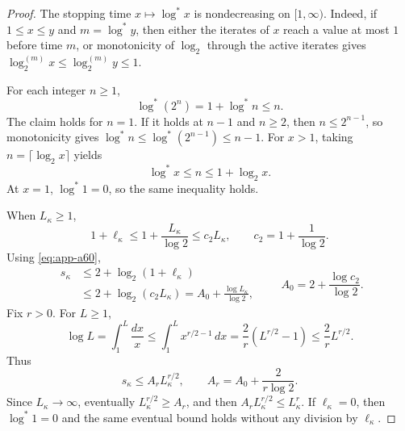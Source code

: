 \begin{proof}
The stopping time \(x\mapsto\log^*x\) is nondecreasing on
\([1,\infty)\).  Indeed, if \(1\leq x\leq y\) and
\(m=\log^*y\), then either the iterates of \(x\) reach a value at most
\(1\) before time \(m\), or monotonicity of \(\log_2\) through the
active iterates gives
\(\log_2^{(m)}x\leq\log_2^{(m)}y\leq1\).

For each integer \(n\geq1\),
\begin{equation}
\log^*(2^n)=1+\log^*n\leq n.
\label{eq:app-a59}
\end{equation}
The claim holds for \(n=1\).  If it holds at \(n-1\) and \(n\geq2\),
then \(n\leq2^{n-1}\), so monotonicity gives
\(\log^*n\leq\log^*(2^{n-1})\leq n-1\).  For \(x>1\), taking
\(n=\lceil\log_2x\rceil\) yields
\begin{equation}
\log^*x
\leq n
\leq1+\log_2x.
\label{eq:app-a60}
\end{equation}
At \(x=1\), \(\log^*1=0\), so the same inequality holds.

When \(L_\kappa\geq1\),
\begin{equation}
1+\ell_\kappa
\leq1+\frac{L_\kappa}{\log2}
\leq c_2L_\kappa,
\qquad
c_2=1+\frac1{\log2}.
\label{eq:app-a61}
\end{equation}
Using \eqref{eq:app-a60},
\begin{equation}
\begin{aligned}
s_\kappa
&\leq2+\log_2(1+\ell_\kappa)\\
&\leq2+\log_2(c_2L_\kappa)
=A_0+\frac{\log L_\kappa}{\log2},
\end{aligned}
\qquad
A_0=2+\frac{\log c_2}{\log2}.
\label{eq:app-a62}
\end{equation}
Fix \(r>0\).  For \(L\geq1\),
\begin{equation}
\log L
=\int_1^L\frac{dx}{x}
\leq\int_1^Lx^{r/2-1}\,dx
=\frac2r(L^{r/2}-1)
\leq\frac2rL^{r/2}.
\label{eq:app-a63}
\end{equation}
Thus
\begin{equation}
s_\kappa\leq
A_rL_\kappa^{r/2},
\qquad
A_r=A_0+\frac{2}{r\log2}.
\label{eq:app-a64}
\end{equation}
Since \(L_\kappa\to\infty\), eventually
\(L_\kappa^{r/2}\geq A_r\), and then
\(A_rL_\kappa^{r/2}\leq L_\kappa^r\).  If
\(\ell_\kappa=0\), then \(\log^*1=0\) and the same eventual bound
holds without any division by \(\ell_\kappa\).
\end{proof}


